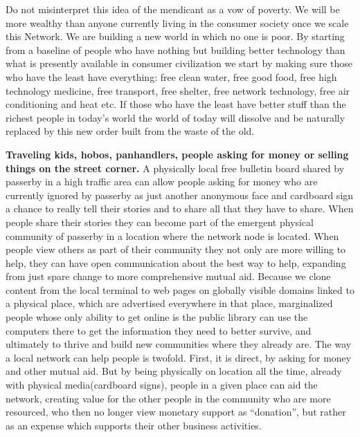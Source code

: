 Do not misinterpret this idea of the mendicant as a vow of poverty.  We will be more wealthy than anyone currently living in the consumer society once we scale this Network.   We are building a new world in which no one is poor.  By starting from a baseline of people who have nothing but building better technology than what is presently available in consumer civilization we start by making sure those who have the least have everything: free clean water, free good food, free high technology medicine, free transport, free shelter, free network technology, free air conditioning and heat etc.  If those who have the least have better stuff than the richest people in today's world the world of today will dissolve and be naturally replaced by this new order built from the waste of the old.

\textbf{Traveling kids, hobos, panhandlers, people asking for money or selling things on the street corner.}  A physically local free bulletin board shared by passerby in a high traffic area can allow people asking for money who are currently ignored by passerby as just another anonymous face and cardboard sign a chance to really tell their stories and to share all that they have to share.  When people share their stories they can become part of the emergent physical community of passerby in a location where the network node is located.  When people view others as part of their community they not only are more willing to help, they can have open communication about the best way to help, expanding from just spare change to more comprehensive mutual aid.  Because we clone content from the local terminal to web pages on globally visible domains linked to a physical place, which are advertised everywhere in that place, marginalized people whose only ability to get online is the public library can use the computers there to get the information they need to better survive, and ultimately to thrive and build new communities where they already are.  The way a local network can help people is twofold. First, it is direct, by asking for money and other mutual aid.  But by being physically on location all the time, already with physical media(cardboard signs), people in a given place can aid the network, creating value for the other people in the community who are more resourced, who then no longer view monetary support as ``donation'', but rather as an expense which supports their other business activities.  

